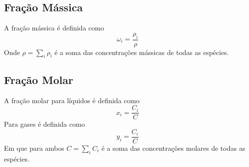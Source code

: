 \subsection{Fração Mássica}
A fração mássica é definida como
\begin{equation}\label{eq:frac_massica}
    \omega _{i} = \frac{\rho _{i} }{\rho }
\end{equation}
Onde \(\rho = \sum_{i} \rho _{i} \) é a soma das concentrações mássicas de todas as espécies. \par
\subsection{Fração Molar}
A fração molar para líquidos é definida como
\begin{equation}\label{eq:frac_molar_liquidos}
    x _{i} = \frac{C_{i} }{C}
\end{equation}
Para gases é definida como
\begin{equation}\label{eq:frac_molar_gas}
    y _{i} = \frac{C_{i} }{C}
\end{equation}
Em que para ambos \(C = \sum_{i} C_{i} \) é a soma das concentrações molares de todas as espécies.
\par

